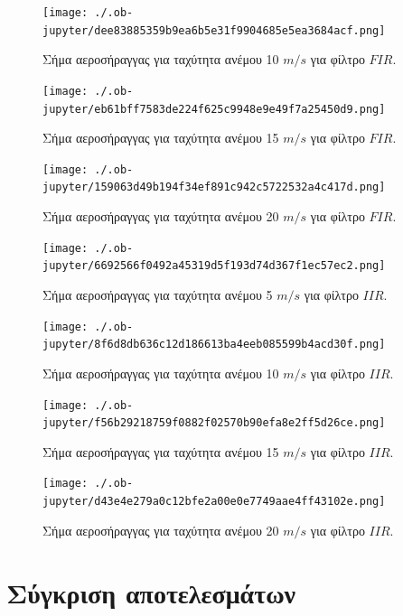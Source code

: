 \documentclass[breaklines=true, 12pt]{article}
\begin{document}
{{{\begin{figure}[htbp]
\centering
\texttt{[image: ./.ob-jupyter/dee83885359b9ea6b5e31f9904685e5ea3684acf.png]}
\caption{\label{fi1_10}Σήμα αεροσήραγγας για ταχύτητα ανέμου 10 \(m/s\) για φίλτρο \(FIR\).}
\end{figure}

\begin{figure}[htbp]
\centering
\texttt{[image: ./.ob-jupyter/eb61bff7583de224f625c9948e9e49f7a25450d9.png]}
\caption{\label{fi1_15}Σήμα αεροσήραγγας για ταχύτητα ανέμου 15 \(m/s\) για φίλτρο \(FIR\).}
\end{figure}

\begin{figure}[htbp]
\centering
\texttt{[image: ./.ob-jupyter/159063d49b194f34ef891c942c5722532a4c417d.png]}
\caption{\label{fi1_w20}Σήμα αεροσήραγγας για ταχύτητα ανέμου 20 \(m/s\) για φίλτρο \(FIR\).}
\end{figure}

\begin{figure}[htbp]
\centering
\texttt{[image: ./.ob-jupyter/6692566f0492a45319d5f193d74d367f1ec57ec2.png]}
\caption{\label{ii1_w5}Σήμα αεροσήραγγας για ταχύτητα ανέμου 5 \(m/s\) για φίλτρο \(IIR\).}
\end{figure}

\begin{figure}[htbp]
\centering
\texttt{[image: ./.ob-jupyter/8f6d8db636c12d186613ba4eeb085599b4acd30f.png]}
\caption{\label{ii1_w10}Σήμα αεροσήραγγας για ταχύτητα ανέμου 10 \(m/s\) για φίλτρο \(IIR\).}
\end{figure}

\begin{figure}[htbp]
\centering
\texttt{[image: ./.ob-jupyter/f56b29218759f0882f02570b90efa8e2ff5d26ce.png]}
\caption{\label{ii1_w15}Σήμα αεροσήραγγας για ταχύτητα ανέμου 15 \(m/s\) για φίλτρο \(IIR\).}
\end{figure}

\begin{figure}[htbp]
\centering
\texttt{[image: ./.ob-jupyter/d43e4e279a0c12bfe2a00e0e7749aae4ff43102e.png]}
\caption{\label{ii1_w20}Σήμα αεροσήραγγας για ταχύτητα ανέμου 20 \(m/s\) για φίλτρο \(IIR\).}
\end{figure}
\clearpage
\section{Σύγκριση αποτελεσμάτων}
\label{sec:orgd4d845d}
}}}
\end{document}
